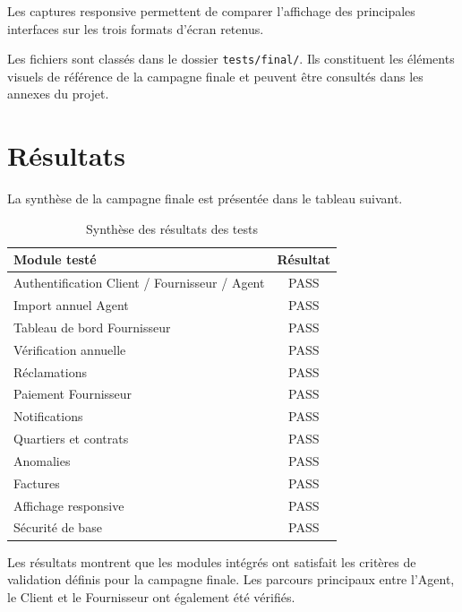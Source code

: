 Les captures responsive permettent de comparer l'affichage des principales interfaces sur les trois formats d'écran retenus.

Les fichiers sont classés dans le dossier \texttt{tests/final/}. Ils constituent les éléments visuels de référence de la campagne finale et peuvent être consultés dans les annexes du projet.

\section{Résultats}

La synthèse de la campagne finale est présentée dans le tableau suivant.

\begin{table}[H]
    \centering
    \caption{Synthèse des résultats des tests}
    \label{tab:synthese-tests}
    \begin{tabular}{|p{}|c|}
        \hline
        \textbf{Module testé} & \textbf{Résultat} \\
        \hline
        Authentification Client / Fournisseur / Agent & PASS \\
        \hline
        Import annuel Agent & PASS \\
        \hline
        Tableau de bord Fournisseur & PASS \\
        \hline
        Vérification annuelle & PASS \\
        \hline
        Réclamations & PASS \\
        \hline
        Paiement Fournisseur & PASS \\
        \hline
        Notifications & PASS \\
        \hline
        Quartiers et contrats & PASS \\
        \hline
        Anomalies & PASS \\
        \hline
        Factures & PASS \\
        \hline
        Affichage responsive & PASS \\
        \hline
        Sécurité de base & PASS \\
        \hline
    \end{tabular}
\end{table}

Les résultats montrent que les modules intégrés ont satisfait les critères de validation définis pour la campagne finale. Les parcours principaux entre l'Agent, le Client et le Fournisseur ont également été vérifiés.

